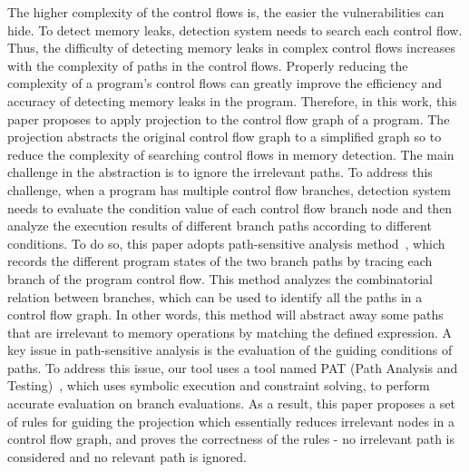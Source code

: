  
The higher complexity of the control flows is, the easier the vulnerabilities can hide. To detect memory leaks, detection system needs to search each control flow. Thus, the difficulty of detecting memory leaks in complex control flows increases with the complexity of paths in the control flows. Properly reducing the complexity of a program’s control flows can greatly improve the efficiency and accuracy of detecting memory leaks in the program. Therefore, in this work, this paper proposes to apply projection to the control flow graph of a program. The projection abstracts the original control flow graph to a simplified graph so to reduce the complexity of searching control flows in memory detection. The main challenge in the abstraction is to ignore the irrelevant paths. To address this challenge, when a program has multiple control flow branches, detection system needs to evaluate the condition value of each control flow branch node and then analyze the execution results of different branch paths according to different conditions. To do so, this paper adopts path-sensitive analysis method~\cite{XA05}, which records the different program states of the two branch paths by tracing each branch of the program control flow. This method analyzes the combinatorial relation between branches, which can be used to identify all the paths in a control flow graph. In other words, this method will abstract away some paths that are irrelevant to memory operations by matching the defined expression. A key issue in path-sensitive analysis is the evaluation of the guiding conditions of paths. To address this issue, our tool uses a tool named PAT (Path Analysis and Testing)~\cite{ZW01}, which uses symbolic execution and constraint solving, to perform accurate evaluation on branch evaluations. %
As a result, this paper proposes a set of rules for guiding the projection which essentially reduces irrelevant nodes in a control flow graph, and proves the correctness of the rules -  no irrelevant path is considered and no relevant path is ignored.


